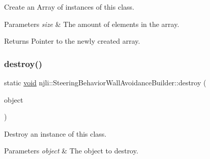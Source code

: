 Create an Array of instances of this class.


\begin{DoxyParams}{Parameters}
{\em size} & The amount of elements in the array.\\
\hline
\end{DoxyParams}
\begin{DoxyReturn}{Returns}
Pointer to the newly created array. 
\end{DoxyReturn}
\mbox{\label{classnjli_1_1_steering_behavior_wall_avoidance_builder_a8aec21f1e7af52a4635b0a14a8b93760}} 
\subsubsection{\texorpdfstring{destroy()}{destroy()}}
{\footnotesize\ttfamily static \mbox{\hyperlink{_thread_8h_af1e856da2e658414cb2456cb6f7ebc66}{void}} njli\+::\+Steering\+Behavior\+Wall\+Avoidance\+Builder\+::destroy (\begin{DoxyParamCaption}\item[{\mbox{\hyperlink{classnjli_1_1_steering_behavior_wall_avoidance_builder}{Steering\+Behavior\+Wall\+Avoidance\+Builder}} $\ast$}]{object }\end{DoxyParamCaption})\hspace{0.3cm}{\ttfamily [static]}}

Destroy an instance of this class.


\begin{DoxyParams}{Parameters}
{\em object} & The object to destroy. \\
\hline
\end{DoxyParams}
\mbox{\label{classnjli_1_1_steering_behavior_wall_avoidance_builder_a1791f5ae92b1b157383493d65dfef923}} 
